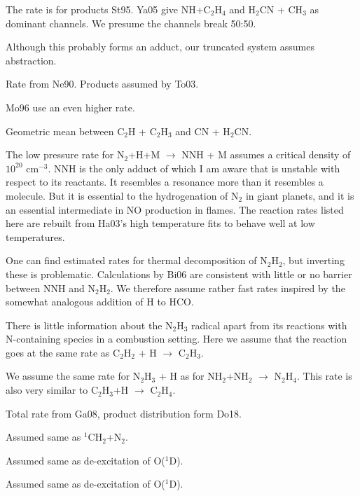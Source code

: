 \documentclass[12pt,landscape]{article}
\newcounter{reaction}
\begin{document}
   The rate is for products St95. Ya05 give NH+C$_2$H$_4$ and H$_2$CN + CH$_3$ as dominant channels.  We presume the channels break 50:50.
 
 Although this probably forms an adduct, our truncated system assumes abstraction.

 Rate from Ne90.  Products assumed by To03.

 Mo96 use an even higher rate.

 Geometric mean between C$_2$H + C$_2$H$_3$ and CN + H$_2$CN.
 
  The low pressure rate for N$_2$+H+M $\rightarrow$ NNH + M assumes a critical density of $10^{20}$ cm$^{-3}$.
NNH is the only adduct of which I am aware that is unstable with respect to its reactants.  It resembles a resonance more than it resembles a molecule.
But it is essential to the hydrogenation of N$_2$ in giant planets, and it is an essential intermediate in NO production in flames.
The reaction rates listed here are rebuilt from Ha03's high temperature fits to behave well at low temperatures.

 One can find estimated rates for thermal decomposition of N$_2$H$_2$, but inverting these is problematic.
Calculations by Bi06 are consistent with little or no barrier between NNH and N$_2$H$_2$.  We therefore assume rather fast rates inspired by the somewhat analogous addition of H to HCO.

 There is little information about the N$_2$H$_3$ radical apart from its reactions with N-containing species in a combustion setting.
 Here we assume that the reaction goes at the same rate as C$_2$H$_2$ + H $\rightarrow$ C$_2$H$_3$.

 We assume the same rate for N$_2$H$_3$ + H as for NH$_2$+NH$_2$ $\rightarrow$ N$_2$H$_4$. 
 This rate is also very similar to C$_2$H$_3$+H $\rightarrow$ C$_2$H$_4$.
 
 Total rate from Ga08, product distribution form Do18.

 Assumed same as $^1$CH$_2$+N$_2$.

 Assumed same as de-excitation of O($^1$D).

 Assumed same as de-excitation of O($^1$D).
\end{document}
